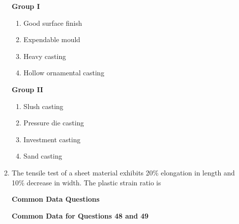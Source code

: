 \documentclass[journal,12pt,onecolumn]{IEEEtran}
\theoremstyle{remark}
\begin{document}
\begin{enumerate}
    \begin{minipage}{0.45\textwidth}
    \textbf{Group I}
    \begin{enumerate}[label=\textbf{\Alph*.}]
    \item Good surface finish
    \item Expendable mould
    \item Heavy casting
    \item Hollow ornamental casting
    \end{enumerate}
    \end{minipage}%
    \hfill
    \begin{minipage}{0.45\textwidth}
    \textbf{Group II}
    \begin{enumerate}[label=\textbf{\arabic*.}]
    \item Slush casting
    \item Pressure die casting
    \item Investment casting
    \item Sand casting
    \end{enumerate}
    \end{minipage}
    \hfill{}
    \begin{enumerate}[label=(\Alph*)]
    \end{enumerate}

    \item  The tensile test of a sheet material exhibits 20\% elongation in length and 10\% decrease in width. The plastic strain ratio is
    \hfill{}
    \begin{enumerate}[label=(\Alph*)]
    \end{enumerate}
    \textbf{Common Data Questions}

    \textbf{Common Data for Questions 48 and 49}


\end{enumerate}
\end{document}
